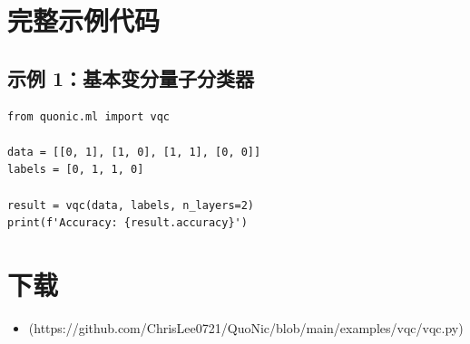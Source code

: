 \documentclass[12pt,a4paper]{article}
\begin{document}
\section{完整示例代码}

\subsection{示例 1：基本变分量子分类器}

\begin{verbatim}
from quonic.ml import vqc

data = [[0, 1], [1, 0], [1, 1], [0, 0]]
labels = [0, 1, 1, 0]

result = vqc(data, labels, n_layers=2)
print(f'Accuracy: {result.accuracy}')
\end{verbatim}

\section{下载}

\begin{itemize}
  \item [vqc.py](https://github.com/ChrisLee0721/QuoNic/blob/main/examples/vqc/vqc.py)
\end{itemize}
\end{document}
